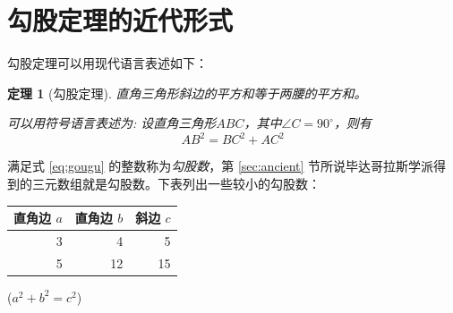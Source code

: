 \documentclass[UTF8]{ctexart}
\newtheorem{thm}{定理}
\newcommand\degree{^\circ}
\begin{document}
\section{勾股定理的近代形式}

勾股定理可以用现代语言表述如下：
\begin{thm}[勾股定理]
直角三角形斜边的平方和等于两腰的平方和。

可以用符号语言表述为: 设直角三角形$ABC$，其中$\angle C = 90\degree$，则有
\begin{equation}\label{eq:gougu}
AB^2 = BC^2 + AC^2
\end{equation}
\end{thm}

满足式 \eqref{eq:gougu} 的整数称为\emph{勾股数}，第 \ref{sec:ancient} 节所说毕达哥拉斯学派得到的三元数组就是勾股数。下表列出一些较小的勾股数：
\begin{table}[H]
\begin{tabular}{|rrr|}
\hline
直角边 $a$ & 直角边 $b$ & 斜边 $c$\\
\hline
3 & 4 & 5\\
5 & 12 & 15\\
\hline
\end{tabular}%
\qquad
($a^2 + b^2 = c^2$)
\end{table}

\nocite{Shiye}

\end{document}
